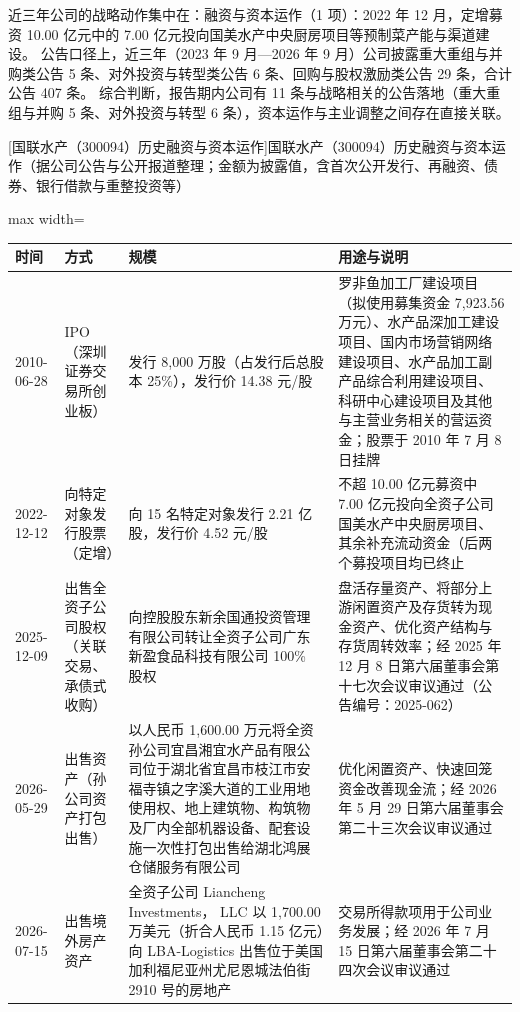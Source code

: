  近三年公司的战略动作集中在：融资与资本运作（1 项）：2022 年 12 月，定增募资 10.00 亿元中的 7.00 亿元投向国美水产中央厨房项目等预制菜产能与渠道建设。 公告口径上，近三年（2023 年 9 月---2026 年 9 月）公司披露重大重组与并购类公告 5 条、对外投资与转型类公告 6 条、回购与股权激励类公告 29 条，合计公告 407 条。 综合判断，报告期内公司有 11 条与战略相关的公告落地（重大重组与并购 5 条、对外投资与转型 6 条），资本运作与主业调整之间存在直接关联。

\begin{center}\small\setlength{\tabcolsep}{4pt}
[国联水产（300094）历史融资与资本运作]{国联水产（300094）历史融资与资本运作（据公司公告与公开报道整理；金额为披露值，含首次公开发行、再融资、债券、银行借款与重整投资等）}
\begin{adjustbox}{max width=\textwidth}
\begin{tabular}{@{}p{1.45cm}p{2.55cm}p{4.05cm}p{4.95cm}@{}}
\toprule
时间 & 方式 & 规模 & 用途与说明 \\
\midrule
2010-06-28 & IPO（深圳证券交易所创业板） & 发行 8,\allowbreak{}000 万股（占发行后总股本 25\%），\allowbreak{}发行价 14.38 元/\allowbreak{}股 & 罗非鱼加工厂建设项目（拟使用募集资金 7,\allowbreak{}923.56 万元）、\allowbreak{}水产品深加工建设项目、\allowbreak{}国内市场营销网络建设项目、\allowbreak{}水产品加工副产品综合利用建设项目、\allowbreak{}科研中心建设项目及其他与主营业务相关的营运资金；股票于 2010 年 7 月 8 日挂牌 \\
2022-12-12 & 向特定对象发行股票（定增） & 向 15 名特定对象发行 2.21 亿股，\allowbreak{}发行价 4.52 元/\allowbreak{}股 & 不超 10.00 亿元募资中 7.00 亿元投向全资子公司国美水产中央厨房项目、\allowbreak{}其余补充流动资金（后两个募投项目均已终止 \\
2025-12-09 & 出售全资子公司股权（关联交易、承债式收购） & 向控股股东新余国通投资管理有限公司转让全资子公司广东新盈食品科技有限公司 100\% 股权 & 盘活存量资产、\allowbreak{}将部分上游闲置资产及存货转为现金资产、\allowbreak{}优化资产结构与存货周转效率；经 2025 年 12 月 8 日第六届董事会第十七次会议审议通过（公告编号：2025-062） \\
2026-05-29 & 出售资产（孙公司资产打包出售） & 以人民币 1,\allowbreak{}600.00 万元将全资孙公司宜昌湘宜水产品有限公司位于湖北省宜昌市枝江市安福寺镇之字溪大道的工业用地使用权、\allowbreak{}地上建筑物、\allowbreak{}构筑物及厂内全部机器设备、\allowbreak{}配套设施一次性打包出售给湖北鸿展仓储服务有限公司 & 优化闲置资产、\allowbreak{}快速回笼资金改善现金流；经 2026 年 5 月 29 日第六届董事会第二十三次会议审议通过 \\
2026-07-15 & 出售境外房产资产 & 全资子公司 Liancheng Investments，\allowbreak{} LLC 以 1,\allowbreak{}700.00 万美元（折合人民币 1.15 亿元）向 LBA-Logistics 出售位于美国加利福尼亚州尤尼恩城法伯街 2910 号的房地产 & 交易所得款项用于公司业务发展；经 2026 年 7 月 15 日第六届董事会第二十四次会议审议通过 \\
\bottomrule
\end{tabular}
\end{adjustbox}
\end{center}

